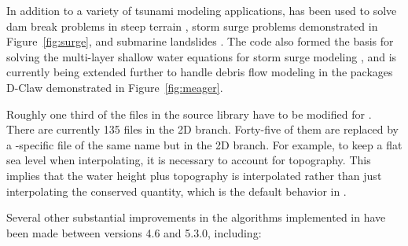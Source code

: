 In addition to a variety of tsunami modeling applications,
\geoclaw has been used to solve dam break problems in steep terrain
\cite{George:Malpasset}, storm surge problems \cite{Mandli:ws} demonstrated in
Figure~\ref{fig:surge},
and submarine landslides \cite{jhkim:phd}.  The code also
formed the basis for solving the 
multi-layer shallow water equations for storm surge modeling
\cite{mandli:phd, Mandli:2013it},
and is currently being extended further to handle debris flow modeling in the
packages D-Claw
\cite{Iverson:2014dc,George:2014gh} demonstrated in Figure~\ref{fig:meager}.

Roughly one third of the files in the \amrclaw source library have to be
modified for \geoclaw. There are currently 135 files in the \amrclaw 2D branch.
Forty-five of them are replaced by a \geoclaw-specific file of the same name but
in the \geoclaw 2D branch. For example, to keep a flat sea level when
interpolating, it is necessary to account for topography. This implies that the
water height plus topography is interpolated rather than just interpolating the
conserved quantity, which is the default behavior in
\amrclaw.

Several other substantial improvements in the
algorithms implemented in \geoclaw have been made between versions 4.6 and
5.3.0, including:

